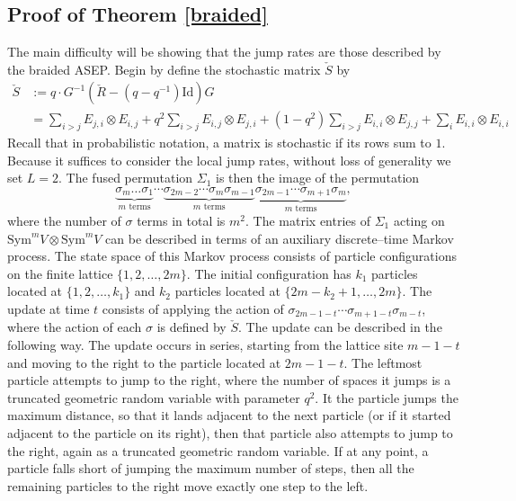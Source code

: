 \documentclass[12pt]{ximera}
\begin{document}
\subsection{Proof of Theorem \ref{braided}}
The main difficulty will be showing that the jump rates are those described by the braided ASEP. Begin by define the stochastic matrix $\check{S}$ by 
\begin{align*}
\check{S} &:= q \cdot G^{-1}( \check{R} - (q-q^{-1})\mathrm{Id})G\\
&= \sum_{i>j} E_{j,i} \otimes E_{i,j} + q ^2\sum_{i>j} E_{i,j} \otimes E_{j,i}+(1-q^2)\sum_{i>j} E_{i,i} \otimes E_{j,j}+  \sum_i  E_{i,i} \otimes E_{i,i}
\end{align*}
Recall that in probabilistic notation, a matrix is stochastic if its rows sum to $1$. Because it suffices to consider the local jump rates, without loss of generality we set $L=2$. The fused permutation $\Sigma_1$ is then the image of the permutation 
$$
 \underbrace{ \sigma_{m}\ldots \sigma_1}_{m \text{ terms}} \cdots \underbrace{\sigma_{2m-2} \cdots  \sigma_{m}\sigma_{m-1}}_{m \text{ terms}}  \underbrace{\sigma_{2m-1} \cdots \sigma_{m+1}\sigma_m}_{m \text{ terms}},
$$
where the number of $\sigma$ terms in total is $m^2$. The matrix entries of $\Sigma_1$ acting on $\mathrm{Sym}^m V \otimes \mathrm{Sym}^m V$ can be described in terms of an auxiliary discrete--time Markov process. The state space of this Markov process consists of particle configurations on the finite lattice $\{1,2,\ldots,2m\}$. The initial configuration has $k_1$ particles located at $\{1,2,\ldots,k_1\}$ and $k_2$ particles located at $\{2m-k_2+1, \ldots, 2m\}$. The update at time $t$ consists of applying the action of $\sigma_{2m-1-t}\cdots \sigma_{m+1-t} \sigma_{m-t}$, where the action of each $\sigma$ is defined by $\check{S}$. The update can be described in the following way. The update occurs in series, starting from the lattice site ${m-1-t}$ and moving to the right to the particle located at $2m-1-t$. The leftmost particle attempts to jump to the right, where the number of spaces it jumps is a truncated geometric random variable with parameter $q^2$. It the particle jumps the maximum distance, so that it lands adjacent to the next particle (or if it started adjacent to the particle on its right), then that particle also attempts to jump to the right, again as a truncated geometric random variable. If at any point, a particle falls short of jumping the maximum number of steps, then all the remaining particles to the right move exactly one step to the left. 
\end{document}
